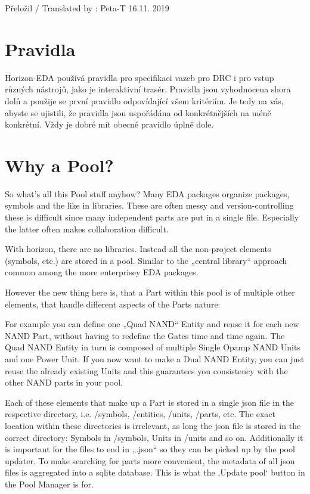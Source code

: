 \documentclass[letterpaper,10pt,czech]{sphinxmanual}
\begin{document}
%
\begin{footnote}[1]\sphinxAtStartFootnote
Přeložil / Translated by : Peta-T 16.11. 2019
%
\end{footnote}


\chapter{Pravidla}
\label{\detokenize{rules:pravidla}}\label{\detokenize{rules::doc}}
Horizon-EDA používá pravidla pro specifikaci vazeb pro DRC i pro vstup různých nástrojů, jako je interaktivní trasér. Pravidla jsou vyhodnocena shora dolů a použije se první pravidlo odpovídající všem kritériím. Je tedy na vás, abyste se ujistili, že pravidla jsou uspořádána od konkrétnějších na méně konkrétní. Vždy je dobré mít obecné pravidlo úplně dole.


\chapter{Why a Pool?}
\label{\detokenize{pool-why:why-a-pool}}\label{\detokenize{pool-why::doc}}
So what’s all this Pool stuff anyhow? Many EDA packages organize
packages, symbols and the like in libraries. These are often messy
and version-controlling these is difficult since many independent
parts are put in a single file. Especially the latter often makes collaboration
difficult.

With horizon, there are no libraries. Instead all the non-project elements
(symbols, etc.) are stored in a pool. Similar to the „central library“
approach common among the more enterprisey EDA packages.

However the new thing here is, that a Part within this pool is  of
multiple other elements, that handle different aspects of the Parts nature:

\noindent{}

For example you can define one „Quad NAND“ Entity and reuse it for each new
NAND Part, without having to redefine the Gates time and time again. The Quad NAND Entity in turn is composed of multiple Single Opamp NAND Units
and one Power Unit. If you now want to make a Dual NAND Entity, you can just reuse
the already existing Units and this guarantees you consistency with the other NAND
parts in your pool.

Each of these elements that make up a Part is stored in a single json file in the
respective directory, i.e. /symbols, /entities, /units, /parts, etc. The exact location within these directories is irrelevant, as long the json file is stored
in the correct directory: Symbols in /symbols, Units in /units and so on.
Additionally it is important for the files to end in „.json“ so they can be
picked up by the pool updater. To make searching for parts more
convenient, the metadata of all json files is aggregated into a sqlite
database. This is what the ‚Update pool‘ button in the Pool Manager is
for.
\end{document}
